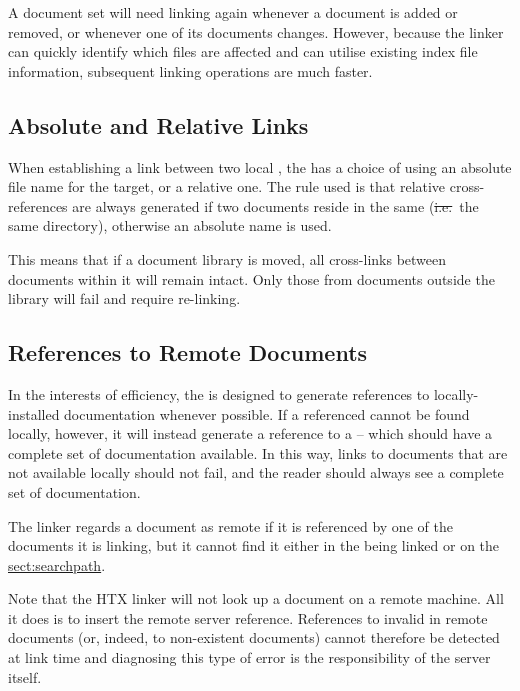 A document set will need linking again whenever a document is added or
removed, or whenever one of its documents changes. However, because
the linker can quickly identify which files are affected and can
utilise existing index file information, subsequent linking operations
are much faster.

\subsection{Absolute and Relative Links}

When establishing a link between two local , the
  has a choice of using an absolute file
name for the target, or a relative one. The rule used is that relative
cross-references are always generated if two documents reside in the
same  (\st{i.e.}\ the same directory),
otherwise an absolute name is used.

This means that if a document library is moved, all cross-links
between documents within it will remain intact. Only those from
documents outside the library will fail and require re-linking.

\subsection{\label{sect:remotedocuments}References to Remote Documents}

In the interests of efficiency, the   is
designed to generate references to locally-installed documentation
whenever possible. If a referenced  cannot be found
locally, however, it will instead generate a reference to a
 -- which should have a complete set
of documentation available.  In this way, links to documents that are
not available locally should not fail, and the reader should always
see a complete set of documentation.

The linker regards a document as remote if it is referenced by one of
the documents it is linking, but it cannot find it either in the
 being linked or on the \hyperref{\hi{HTX\_PATH}
search path}{\hi{HTX\_PATH} search path (see \S}{)}{sect:searchpath}.

Note that the HTX linker will not look up a document on a remote
machine. All it does is to insert the remote server reference.
References to invalid  in remote documents (or, indeed,
to non-existent documents) cannot therefore be detected at link time
and diagnosing this type of error is the responsibility of the server
itself.

